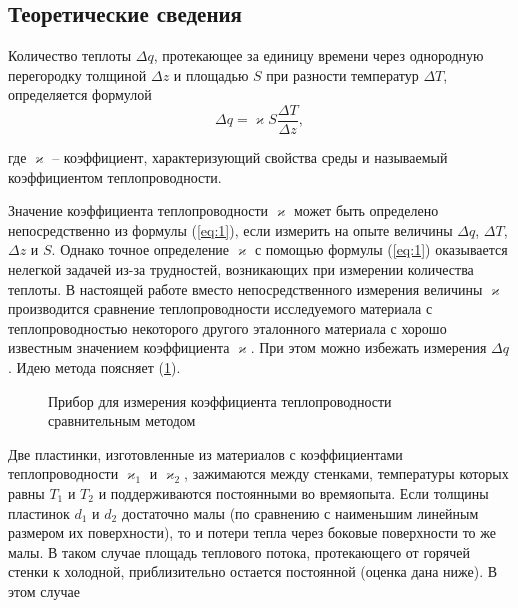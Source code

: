 \documentclass[a4paper,11.5pt]{article} %
\begin{document}
\subsection{Теоретические сведения}

Количество теплоты $\Delta q$, протекающее за единицу времени через однородную перегородку толщиной $\Delta z$ и площадью $S$ при разности температур $\Delta T$, определяется формулой
\begin{equation}
	\Delta q =  \varkappa S \frac{\Delta T}{\Delta z},
	\label{eq:1}
\end{equation}

где $\varkappa$ -- коэффициент, характеризующий свойства среды и называемый коэффициентом теплопроводности.

Значение коэффициента теплопроводности $\varkappa$ может быть определено непосредственно из формулы (\ref{eq:1}), если измерить на опыте величины $\Delta q$, $\Delta T$, $\Delta z$ и $S$. Однако точное определение $\varkappa$ с помощью формулы (\ref{eq:1}) оказывается нелегкой задачей из-за трудностей, возникающих при измерении количества теплоты. В настоящей работе вместо непосредственного измерения величины $\varkappa$ производится сравнение теплопроводности исследуемого материала с теплопроводностью некоторого другого эталонного материала с хорошо известным значением коэффициента $\varkappa$. При этом можно избежать измерения $\Delta q$. Идею метода поясняет (\ref{pic:1}).

\begin{figure}[h]
	\caption{Прибор для измерения коэффициента теплопроводности
сравнительным методом}
	\label{pic:1}
\end{figure}

Две пластинки, изготовленные из материалов с коэффициентами теплопроводности $\varkappa_1$ и $\varkappa_2$, зажимаются между стенками, температуры которых равны $T_1$ и $T_2$ и поддерживаются постоянными во времяопыта. Если толщины пластинок $d_1$ и $d_2$ достаточно малы (по сравнению с наименьшим линейным размером их поверхности), то и потери тепла через боковые поверхности то
же малы. В таком случае площадь теплового потока, протекающего от горячей стенки к холодной, приблизительно остается постоянной (оценка дана ниже). В этом случае
\end{document}
